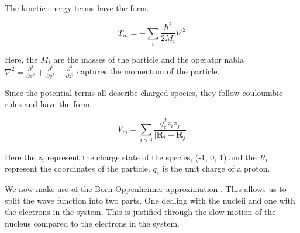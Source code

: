 The kinetic energy terms have the form.

\begin {equation}
T_m = - \sum_i \frac{\hbar^2}{2M_i} \nabla^2
\end {equation}

Here, the $M_i$ are the masses of the particle and the operator nabla $\nabla^2 = \frac{\partial^2}{\partial x^2} + \frac{\partial^2 }{\partial y^2} + \frac{\partial^2}{\partial z^2} $ captures the momentum of the particle. 

Since the potential terms all describe charged species, they follow couloumbic rules and have the form.

\begin{equation}
	V_m = \sum_{i>j} \frac{q_e^2 z_i z_j }{|\textbf{R}_i-\textbf{R}_j}
\end{equation}

Here the $z_i$ represent the charge state of the species, (-1, 0, 1) and the $R_i$ represent the coordinates of the particle. $q_e$ is the unit charge of a proton.

We now make use of the Born-Oppenheimer approximation \cite{Born1927}. This allows us to split the wave function into two parts. One dealing with the nucleii and one with the electrons in the system. This is justified through the slow motion of the nucleus compared to the electrons in the system.
